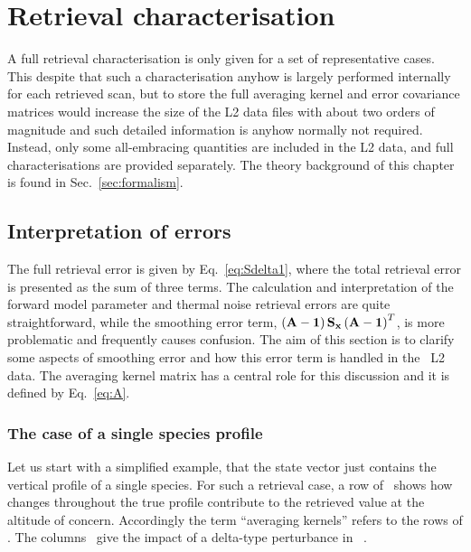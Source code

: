 \chapter{Retrieval characterisation}
\label{chapter:characterisation}
%
A full retrieval characterisation is only given for a set of representative
cases. This despite that such a characterisation anyhow is largely performed
internally for each retrieved scan, but to store the full averaging kernel and
error covariance matrices would increase the size of the L2 data files with
about two orders of magnitude and such detailed information is anyhow normally
not required. Instead, only some all-embracing quantities are included in the
L2 data, and full characterisations are provided separately. The theory
background of this chapter is found in Sec.~\ref{sec:formalism}.
 


\section{Interpretation of errors}
\label{sec:char:interpret}
%
The full retrieval error is given by Eq.~\ref{eq:Sdelta1}, where the total
retrieval error is presented as the sum of three terms. The calculation and
interpretation of the forward model parameter and thermal noise retrieval
errors are quite straightforward, while the smoothing error term,
$\left(\mathbf{A}-\mathbf{1}\right)\mathbf{S}_{\mathbf{x}}\left(\mathbf{A}-\mathbf{1}\right)^T$,
is more problematic and frequently causes confusion. The aim of this section
is to clarify some aspects of smoothing error and how this error term is
handled in the \smr\ L2 data. The averaging kernel matrix has a central
role for this discussion and it is defined by Eq.~\ref{eq:A}.


\subsection*{The case of a single species profile}
%
Let us start with a simplified example, that the state vector just contains the
vertical profile of a single species. For such a retrieval case, a row of
\AvrKrnMtr\ shows how changes throughout the true profile contribute to the
retrieved value at the altitude of concern. Accordingly the term ``averaging
kernels'' refers to the rows of \AvrKrnMtr. The columns \AvrKrnMtr\ give the
impact of a delta-type perturbance in \SttVct\ \citep{rodgers:00}.

